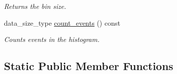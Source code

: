 \begin{DoxyCompactItemize}
\begin{DoxyCompactList}\small\item\em Returns the bin size. \end{DoxyCompactList}\item 
\hypertarget{a00280_abd504b4f85197308a6e49781252471e9}{data\-\_\-size\-\_\-type \hyperlink{a00280_abd504b4f85197308a6e49781252471e9}{count\-\_\-events} () const }\label{a00280_abd504b4f85197308a6e49781252471e9}

\begin{DoxyCompactList}\small\item\em Counts events in the histogram. \end{DoxyCompactList}\end{DoxyCompactItemize}
\subsection*{Static Public Member Functions}
